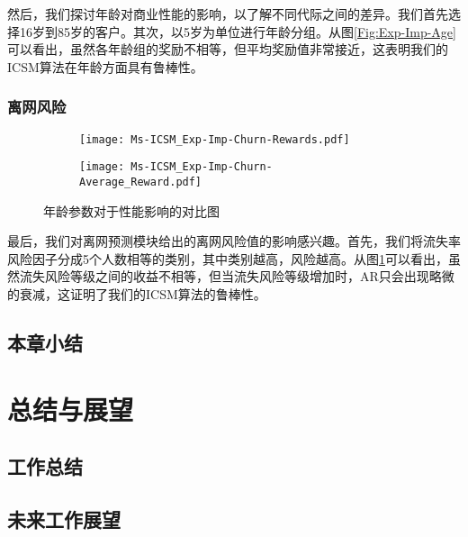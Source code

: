 然后，我们探讨年龄对商业性能的影响，以了解不同代际之间的差异。我们首先选择16岁到85岁的客户。其次，以5岁为单位进行年龄分组。从图\ref{Fig:Exp-Imp-Age}可以看出，虽然各年龄组的奖励不相等，但平均奖励值非常接近，这表明我们的ICSM算法在年龄方面具有鲁棒性。

\subsubsection{离网风险}
\begin{figure}[!htb]
	\centering
	\begin{subfigure}[t]{0.49\linewidth}
		\captionsetup{justification=centering} %
		\begin{minipage}[b]{1\linewidth}
			\texttt{[image: Ms-ICSM\_Exp-Imp-Churn-Rewards.pdf]}
			\caption{}
		\end{minipage}
	\end{subfigure}
	\begin{subfigure}[t]{0.49\linewidth}
		\captionsetup{justification=centering} %
		\begin{minipage}[b]{1\linewidth}
			\texttt{[image: Ms-ICSM\_Exp-Imp-Churn-Average\_Reward.pdf]}
			\caption{}
		\end{minipage}
	\end{subfigure}	
	\caption{年龄参数对于性能影响的对比图}
	\label{Fig:Exp-Imp-Churn}
\end{figure}
最后，我们对离网预测模块给出的离网风险值的影响感兴趣。首先，我们将流失率风险因子分成5个人数相等的类别，其中类别越高，风险越高。从图\ref{Fig:Exp-Imp-Churn}可以看出，虽然流失风险等级之间的收益不相等，但当流失风险等级增加时，AR只会出现略微的衰减，这证明了我们的ICSM算法的鲁棒性。

\subsection{本章小结}

\newpage

\section{总结与展望}
\subsection{工作总结}
\subsection{未来工作展望}
\newpage

